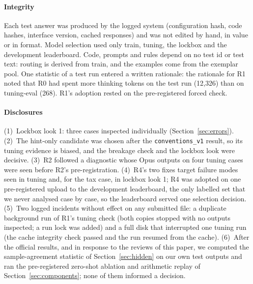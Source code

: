\documentclass[conference]{IEEEtran}
\newcommand{\id}[1]{\texttt{#1}}
\begin{document}
\paragraph*{Integrity}
Each test answer was produced by the logged system (configuration hash, code hashes, interface version, cached responses) and was not edited by hand, in value or in format. Model selection used only train, tuning, the lockbox and the development leaderboard. Code, prompts and rules depend on no test id or test text: routing is derived from train, and the examples come from the exemplar pool. One statistic of a test run entered a written rationale: the rationale for R1 noted that R0 had spent more thinking tokens on the test run (12,326) than on tuning-eval (268). R1's adoption rested on the pre-registered forced check.

\paragraph*{Disclosures}
(1)~Lockbox look 1: three cases inspected individually (Section~\ref{sec:errors}). (2)~The hint-only candidate was chosen after the \id{conventions\_v1} result, so its tuning evidence is biased, and the breakage check and the lockbox look were decisive. (3)~R2 followed a diagnostic whose Opus outputs on four tuning cases were seen before R2's pre-registration. (4)~R4's two fixes target failure modes seen in tuning and, for the tax case, in lockbox look 1; R4 was adopted on one pre-registered upload to the development leaderboard, the only labelled set that we never analysed case by case, so the leaderboard served one selection decision. (5)~Two logged incidents without effect on any submitted file: a duplicate background run of R1's tuning check (both copies stopped with no outputs inspected; a run lock was added) and a full disk that interrupted one tuning run (the cache integrity check passed and the run resumed from the cache). (6)~After the official results, and in response to the reviews of this paper, we computed the sample-agreement statistic of Section~\ref{sec:hidden} on our own test outputs and ran the pre-registered zero-shot ablation and arithmetic replay of Section~\ref{sec:components}; none of them informed a decision.
\end{document}

